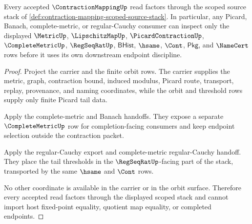 \begin{theorem}
\label{thm:contraction-mapping-scoped-dependency-surface}
Every accepted $\ContractionMappingUp$ read factors through the scoped source stack of \autoref{def:contraction-mapping-scoped-source-stack}. In particular, any Picard, Banach, complete-metric, or regular-Cauchy consumer can inspect only the displayed $\MetricUp$, $\LipschitzMapUp$, $\PicardContractionUp$, $\CompleteMetricUp$, $\RegSeqRatUp$, $\mathsf{BHist}$, $\hsame$, $\Cont$, $\mathsf{Pkg}$, and $\NameCert$ rows before it uses its own downstream endpoint discipline.
\end{theorem}
\begin{proof}
Project the carrier and the finite orbit rows. The carrier supplies the metric, graph, contraction bound, induced modulus, Picard route, transport, replay, provenance, and naming coordinates, while the orbit and threshold rows supply only finite Picard tail data.

Apply the complete-metric and Banach handoffs. They expose a separate $\CompleteMetricUp$ row for completion-facing consumers and keep endpoint selection outside the contraction packet.

Apply the regular-Cauchy export and complete-metric regular-Cauchy handoff. They place the tail thresholds in the $\RegSeqRatUp$-facing part of the stack, transported by the same $\hsame$ and $\Cont$ rows.

No other coordinate is available in the carrier or in the orbit surface. Therefore every accepted read factors through the displayed scoped stack and cannot import host fixed-point equality, quotient map equality, or completed endpoints.
\end{proof}

